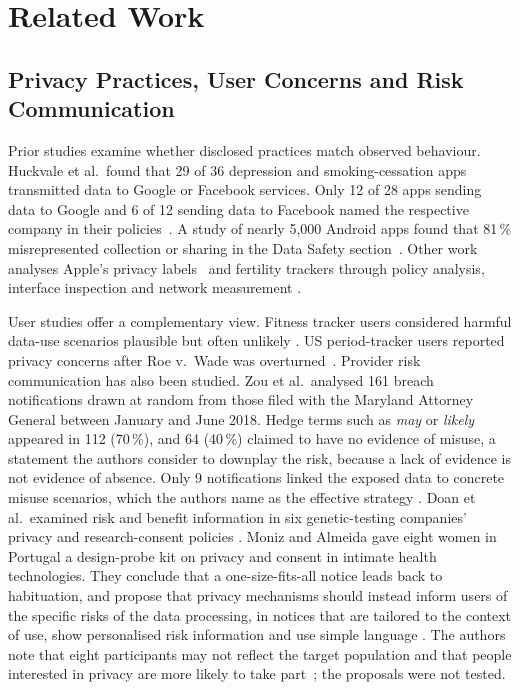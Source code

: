\documentclass[twoside,its]{bossthesis}
\begin{document}
\chapter{Related Work}
\label{ch:related-work}

\section{Privacy Practices, User Concerns and Risk Communication}
Prior studies examine whether disclosed practices match observed behaviour.
Huckvale et al.\ found that 29 of 36 depression and smoking-cessation apps
transmitted data to Google or Facebook services. Only 12 of 28 apps sending
data to Google and 6 of 12 sending data to Facebook named the respective
company in their policies~\parencite{huckvale2019assessment}. A study of nearly
5{,}000 Android apps found that 81\,\% misrepresented collection or sharing in
the Data Safety section~\parencite{arkalakis2024abandon}. Other work analyses
Apple's privacy labels~\parencite{li2022ios} and fertility trackers through
policy analysis, interface inspection and network measurement
\parencite{shipp2020period,malki2024exploring,hudig2025intimate}.

User studies offer a complementary view. Fitness tracker users considered
harmful data-use scenarios plausible but often unlikely
\parencite{gabriele2020understanding}. US period-tracker users reported privacy
concerns after Roe v.~Wade was overturned~\parencite{cao2024deleted}.
Provider risk communication has also been studied. Zou et al.\ analysed 161
breach notifications drawn at random from those filed with the Maryland
Attorney General between January and June 2018. Hedge
terms such as \emph{may} or \emph{likely} appeared in 112 (70\,\%), and 64
(40\,\%) claimed to have no evidence of misuse, a statement the authors
consider to downplay the risk, because a lack of evidence is not evidence of
absence. Only 9 notifications linked the exposed data to concrete misuse
scenarios, which the authors name as the effective strategy
\parencite[\S5, p.~7]{zou2019might}. Doan et al.\ examined risk and benefit information in
six genetic-testing companies' privacy and research-consent policies
\parencite{doan2024transparency}. Moniz and Almeida gave eight women in
Portugal a design-probe kit on privacy and consent in intimate health
technologies. They conclude that a one-size-fits-all notice leads back to
habituation, and propose that privacy mechanisms should instead inform users
of the specific risks of the data processing, in notices that are tailored to
the context of use, show personalised risk information and use simple language
\parencite[\S5.2]{moniz2025toward}. The authors note that eight participants
may not reflect the target population and that people interested in privacy
are more likely to take part~\parencite[\S3.6]{moniz2025toward}; the proposals
were not tested.
\end{document}
